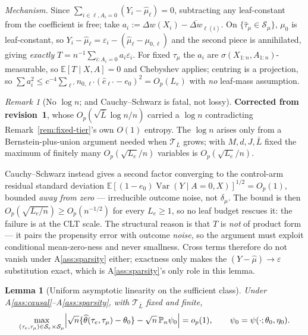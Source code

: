 \documentclass[11pt]{article}
\theoremstyle{plain}
\newtheorem{lemma}{Lemma}
\theoremstyle{definition}
\theoremstyle{remark}
\newtheorem{remark}{Remark}
\newcommand{\E}{\mathbb{E}}
\newcommand{\Pn}{\mathbb{P}_n}
\newcommand{\cT}{\mathcal{T}}
\newcommand{\cS}{\mathcal{S}}
\newcommand{\ez}{e_0}
\newcommand{\mz}{\mu_0}
\newcommand{\ehat}{\widehat{e}}
\newcommand{\mhat}{\widehat{\mu}}
\newcommand{\that}{\widehat{\tau}}
\newcommand{\thetahat}{\widehat{\theta}}
\DeclareMathOperator{\Var}{Var}
\begin{document}
\noindent \emph{Mechanism.} Since $\sum_{i\in\ell,A_i=0}(Y_i-\mhat_\ell)=0$,
subtracting any leaf-constant from the coefficient is free; take
$a_i:=\Delta w(X_i)-\overline{\Delta w}_{\ell(i)}$. On
$\{\that_\mu\in\cS_\mu\}$, $\mz$ is leaf-constant, so
$Y_i-\mhat_\ell=\varepsilon_i-(\mhat_\ell-\mu_{0,\ell})$ and the second piece is
annihilated, giving \emph{exactly} $T=n^{-1}\sum_{i:A_i=0}a_i\varepsilon_i$. For
fixed $\tau_\mu$ the $a_i$ are $\sigma(X_{1:n},A_{1:n})$-measurable, so
$\E[T\mid X,A]=0$ and Chebyshev applies; centring is a projection, so
$\sum a_i^2\le c^{-4}\sum_{\ell'}n_{0,\ell'}(\ehat_{\ell'}-\ez)^2=O_p(L_e)$ with
\emph{no} leaf-mass assumption.

\begin{remark}[No $\log n$; and Cauchy--Schwarz is fatal, not lossy]\label{rem:cs}
\textbf{Corrected from revision~1}, whose $O_p(\sqrt{\bar L}\log n/n)$ carried a
$\log n$ contradicting Remark~\ref{rem:fixed-tier}'s own $O(1)$ entropy. The
$\log n$ arises only from a Bernstein-plus-union argument needed when
$\cT_{\bar L}$ grows; with $M,d,J,\bar L$ fixed the maximum of finitely many
$O_p(\sqrt{L_e}/n)$ variables is $O_p(\sqrt{L_e}/n)$.

Cauchy--Schwarz instead gives a second factor converging to the control-arm
residual standard deviation $\E[(1-\ez)\Var(Y\mid A=0,X)]^{1/2}=O_p(1)$, bounded
\emph{away from zero} --- irreducible outcome noise, not $\delta_\mu$. The bound
is then $O_p(\sqrt{L_e/n})\ge O_p(n^{-1/2})$ for every $L_e\ge1$, so no leaf
budget rescues it: the failure is at the CLT scale. The structural reason is that
$T$ is \emph{not} of product form --- it pairs the propensity error with outcome
\emph{noise}, so the argument must exploit conditional mean-zero-ness and never
smallness. Cross terms therefore do not vanish under A\ref{ass:sparsity} either;
exactness only makes the $(Y-\mhat)\to\varepsilon$ substitution exact, which is
A\ref{ass:sparsity}'s only role in this lemma.
\end{remark}

\begin{lemma}[Uniform asymptotic linearity on the sufficient class]
\label{lem:uniform}
Under A\ref{ass:causal}--A\ref{ass:sparsity}, with $\cT_{\bar L}$ fixed and
finite,
\[
 \max_{(\tau_e,\tau_\mu)\in\cS_e\times\cS_\mu}
 \Bigl\lvert\sqrt n\{\thetahat(\tau_e,\tau_\mu)-\theta_0\}
  -\sqrt n\,\Pn\psi_0\Bigr\rvert=o_p(1),\qquad
 \psi_0=\psi(\cdot;\theta_0,\eta_0).
\]
\end{lemma}
\end{document}

